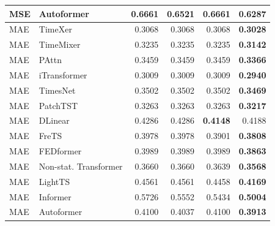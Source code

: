 \begin{longtable}{llrrrr}
MSE & Autoformer & 0.6661 & 0.6521 & 0.6661 & \textbf{0.6287} \\
\midrule
MAE & TimeXer & 0.3068 & 0.3068 & 0.3068 & \textbf{0.3028} \\
MAE & TimeMixer & 0.3235 & 0.3235 & 0.3235 & \textbf{0.3142} \\
MAE & PAttn & 0.3459 & 0.3459 & 0.3459 & \textbf{0.3366} \\
MAE & iTransformer & 0.3009 & 0.3009 & 0.3009 & \textbf{0.2940} \\
MAE & TimesNet & 0.3502 & 0.3502 & 0.3502 & \textbf{0.3469} \\
MAE & PatchTST & 0.3263 & 0.3263 & 0.3263 & \textbf{0.3217} \\
MAE & DLinear & 0.4286 & 0.4286 & \textbf{0.4148} & 0.4188 \\
MAE & FreTS & 0.3978 & 0.3978 & 0.3901 & \textbf{0.3808} \\
MAE & FEDformer & 0.3989 & 0.3989 & 0.3989 & \textbf{0.3863} \\
MAE & Non-stat. Transformer & 0.3660 & 0.3660 & 0.3639 & \textbf{0.3568} \\
MAE & LightTS & 0.4561 & 0.4561 & 0.4458 & \textbf{0.4169} \\
MAE & Informer & 0.5726 & 0.5552 & 0.5434 & \textbf{0.5004} \\
MAE & Autoformer & 0.4100 & 0.4037 & 0.4100 & \textbf{0.3913} \\
\end{longtable}
\endgroup

